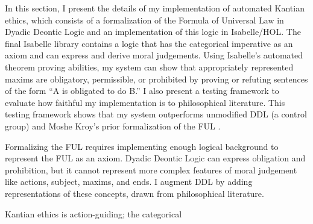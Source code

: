 %
\begin{isabellebody}%
%
%
\isadelimtheory
%
\endisadelimtheory
%
\isatagtheory
%
\endisatagtheory
{\isafoldtheory}%
%
\isadelimtheory
%
\endisadelimtheory
%
\isadelimdocument
%
\endisadelimdocument
%
\isatagdocument
%
\isamarkuptrue%
%
\endisatagdocument
{\isafolddocument}%
%
\isadelimdocument
%
\endisadelimdocument
%
\begin{isamarkuptext}%
In this section, I present the details of my implementation of automated Kantian ethics, which consists of
a formalization of the Formula of Universal Law in Dyadic Deontic Logic and an implementation of this logic in Isabelle/HOL. The final
Isabelle library contains a logic that has the categorical imperative as an axiom and can express and derive moral judgements. 
Using Isabelle's automated theorem proving abilities, my system can show that appropriately represented
maxims are obligatory, permissible, or prohibited by proving or refuting sentences of the form ``A 
is obligated to do B.'' I also present a testing framework to evaluate how faithful my implementation is 
to philosophical literature. This testing framework shows that my system outperforms unmodified DDL 
(a control group) and Moshe Kroy's prior formalization of the FUL \citep{kroy}.%
\end{isamarkuptext}\isamarkuptrue%
%
\isadelimdocument
%
\endisadelimdocument
%
\isatagdocument
%
\isamarkuptrue%
%
\endisatagdocument
{\isafolddocument}%
%
\isadelimdocument
%
\endisadelimdocument
%
\begin{isamarkuptext}%
Formalizing the FUL requires implementing enough logical background to represent 
the FUL as an axiom. Dyadic Deontic Logic can express obligation and prohibition, but it cannot 
represent more complex features of moral judgement like actions, subject, maxims, and ends. I augment 
DDL by adding representations of these concepts, drawn from philosophical literature.%
\end{isamarkuptext}\isamarkuptrue%
%
\isadelimdocument
%
\endisadelimdocument
%
\isatagdocument
%
\isamarkuptrue%
%
\endisatagdocument
{\isafolddocument}%
%
\isadelimdocument
%
\endisadelimdocument
%
\begin{isamarkuptext}%
Kantian ethics is action-guiding; the categorical

\end{isamarkuptext}
\end{isabellebody}
